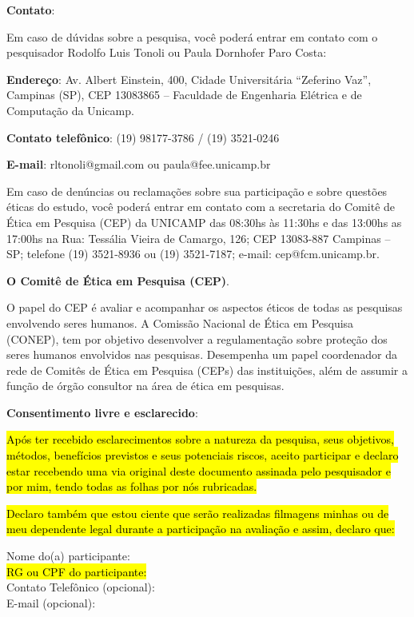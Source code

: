 \documentclass[a4paper,11pt,titlepage,singlespacing]{article}
\begin{document}
\vspace{10pt}
\textbf{Contato}:

Em caso de dúvidas sobre a pesquisa, você poderá entrar em contato com o pesquisador Rodolfo Luis Tonoli ou Paula Dornhofer Paro Costa:

\textbf{Endereço}: Av. Albert Einstein, 400, Cidade Universitária “Zeferino Vaz”, Campinas (SP), CEP
13083865 – Faculdade de Engenharia Elétrica e de Computação da Unicamp.

\textbf{Contato telefônico}: (19) 98177-3786 / (19) 3521-0246

\textbf{E-mail}: rltonoli@gmail.com ou paula@fee.unicamp.br

Em caso de denúncias ou reclamações sobre sua participação e sobre questões éticas do estudo,
você poderá entrar em contato com a secretaria do Comitê de Ética em Pesquisa (CEP) da UNICAMP das 08:30hs às 11:30hs e das 13:00hs as 17:00hs na Rua: Tessália Vieira de Camargo, 126; CEP 13083-887 Campinas – SP; telefone (19) 3521-8936 ou (19) 3521-7187; e-mail: cep@fcm.unicamp.br.

\vspace{10pt}
\textbf{O Comitê de Ética em Pesquisa (CEP)}.

O papel do CEP é avaliar e acompanhar os aspectos éticos de todas as pesquisas envolvendo seres humanos. A Comissão Nacional de Ética em Pesquisa (CONEP), tem por objetivo desenvolver a regulamentação sobre proteção dos seres humanos
envolvidos nas pesquisas. Desempenha um papel coordenador da rede de Comitês de
Ética em Pesquisa (CEPs) das instituições, além de assumir a função de órgão
consultor na área de ética em pesquisas.
\vspace{10pt}

\textbf{Consentimento livre e esclarecido}:

\hl{Após ter recebido esclarecimentos sobre a natureza da pesquisa, seus objetivos, métodos, benefícios
previstos e seus potenciais riscos, aceito participar e declaro estar
recebendo uma via original deste documento assinada pelo pesquisador e por mim, tendo todas as folhas
por nós rubricadas.}

\hl{Declaro também que estou ciente que serão realizadas filmagens minhas ou de meu dependente legal durante a participação na avaliação e assim, declaro que:}

\vspace{5pt}
\noindent Nome do(a) participante:\hrulefill\\
\noindent \hl{RG ou CPF do participante:}\hrulefill\\
\noindent Contato Telefônico (opcional):\hrulefill\\
E-mail (opcional):\hrulefill\\
\vspace{5pt}
\end{document}

